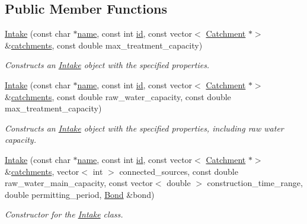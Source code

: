 \subsection*{Public Member Functions}
\begin{DoxyCompactItemize}
\item 
\mbox{\hyperlink{classIntake_a02e01801fcaede46e960d497e60eb335}{Intake}} (const char $\ast$\mbox{\hyperlink{classWaterSource_a846ea74c5b453d014f594d41fee8c765}{name}}, const int \mbox{\hyperlink{classWaterSource_a6eafe5dfefd317877d1244e8a7c6e742}{id}}, const vector$<$ \mbox{\hyperlink{classCatchment}{Catchment}} $\ast$$>$ \&\mbox{\hyperlink{classWaterSource_a8c18c34f23f8a06685c1d12f462ed830}{catchments}}, const double max\+\_\+treatment\+\_\+capacity)
\begin{DoxyCompactList}\small\item\em Constructs an \mbox{\hyperlink{classIntake}{Intake}} object with the specified properties. \end{DoxyCompactList}\item 
\mbox{\hyperlink{classIntake_ada4924f9507f07853feb5cb411d1c336}{Intake}} (const char $\ast$\mbox{\hyperlink{classWaterSource_a846ea74c5b453d014f594d41fee8c765}{name}}, const int \mbox{\hyperlink{classWaterSource_a6eafe5dfefd317877d1244e8a7c6e742}{id}}, const vector$<$ \mbox{\hyperlink{classCatchment}{Catchment}} $\ast$$>$ \&\mbox{\hyperlink{classWaterSource_a8c18c34f23f8a06685c1d12f462ed830}{catchments}}, const double raw\+\_\+water\+\_\+capacity, const double max\+\_\+treatment\+\_\+capacity)
\begin{DoxyCompactList}\small\item\em Constructs an \mbox{\hyperlink{classIntake}{Intake}} object with the specified properties, including raw water capacity. \end{DoxyCompactList}\item 
\mbox{\hyperlink{classIntake_a1f6fbdc6fff65337b70b7ca59f061bb4}{Intake}} (const char $\ast$\mbox{\hyperlink{classWaterSource_a846ea74c5b453d014f594d41fee8c765}{name}}, const int \mbox{\hyperlink{classWaterSource_a6eafe5dfefd317877d1244e8a7c6e742}{id}}, const vector$<$ \mbox{\hyperlink{classCatchment}{Catchment}} $\ast$$>$ \&\mbox{\hyperlink{classWaterSource_a8c18c34f23f8a06685c1d12f462ed830}{catchments}}, vector$<$ int $>$ connected\+\_\+sources, const double raw\+\_\+water\+\_\+main\+\_\+capacity, const vector$<$ double $>$ construction\+\_\+time\+\_\+range, double permitting\+\_\+period, \mbox{\hyperlink{classBond}{Bond}} \&bond)
\begin{DoxyCompactList}\small\item\em Constructor for the \mbox{\hyperlink{classIntake}{Intake}} class. \end{DoxyCompactList}\item 
$$
\end{DoxyCompactItemize}
